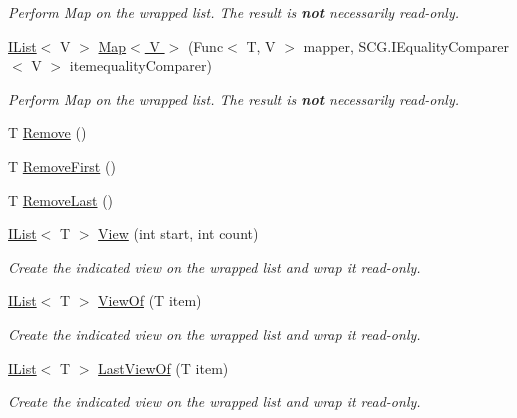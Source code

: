 \begin{DoxyCompactItemize}
\begin{DoxyCompactList}\small\item\em Perform Map on the wrapped list. The result is {\bfseries not} necessarily read-\/only. \end{DoxyCompactList}\item 
\hyperlink{interface_c5_1_1_i_list}{I\+List}$<$ V $>$ \hyperlink{class_c5_1_1_guarded_list_a468610da48a606cd83a609bd116d277c}{Map$<$ V $>$} (Func$<$ T, V $>$ mapper, S\+C\+G.\+I\+Equality\+Comparer$<$ V $>$ itemequality\+Comparer)
\begin{DoxyCompactList}\small\item\em Perform Map on the wrapped list. The result is {\bfseries not} necessarily read-\/only. \end{DoxyCompactList}\item 
T \hyperlink{class_c5_1_1_guarded_list_afdeda008aae91bbbe607012e0e64bac4}{Remove} ()
\item 
T \hyperlink{class_c5_1_1_guarded_list_a5cc22aac9bcdf45c68a285c21e8d1b8d}{Remove\+First} ()
\item 
T \hyperlink{class_c5_1_1_guarded_list_abd9f4b23595221985b5b329b245c0abc}{Remove\+Last} ()
\item 
\hyperlink{interface_c5_1_1_i_list}{I\+List}$<$ T $>$ \hyperlink{class_c5_1_1_guarded_list_affee649b70a9ef563a307f9dbedd04df}{View} (int start, int count)
\begin{DoxyCompactList}\small\item\em Create the indicated view on the wrapped list and wrap it read-\/only. \end{DoxyCompactList}\item 
\hyperlink{interface_c5_1_1_i_list}{I\+List}$<$ T $>$ \hyperlink{class_c5_1_1_guarded_list_a62921460eae17301a85a077aa26e98e3}{View\+Of} (T item)
\begin{DoxyCompactList}\small\item\em Create the indicated view on the wrapped list and wrap it read-\/only. \end{DoxyCompactList}\item 
\hyperlink{interface_c5_1_1_i_list}{I\+List}$<$ T $>$ \hyperlink{class_c5_1_1_guarded_list_a48deee08c78c1e766fb4bbbbf88dc83a}{Last\+View\+Of} (T item)
\begin{DoxyCompactList}\small\item\em Create the indicated view on the wrapped list and wrap it read-\/only. \end{DoxyCompactList}\item 

\end{DoxyCompactItemize}
